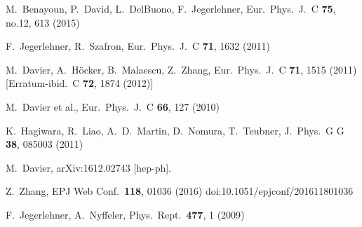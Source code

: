 \documentclass[epj,onecolumn]{webofc}
\begin{document}
\begin{thebibliography}{}
  M.~Benayoun, P.~David, L.~DelBuono, F.~Jegerlehner,
  Eur.\ Phys.\ J.\ C {\bf 75}, no.12,  613 (2015)

  F.~Jegerlehner, R.~Szafron,
  Eur.\ Phys.\ J.\ C {\bf 71}, 1632 (2011)

  M.~Davier, A.~H\"ocker, B.~Malaescu, Z.~Zhang,
  Eur.\ Phys.\ J.\ C {\bf 71}, 1515 (2011)
   [Erratum-ibid.\ C {\bf 72}, 1874 (2012)]

  M.~Davier et al.,
  Eur.\ Phys.\ J.\  C {\bf 66}, 127 (2010)

  K.~Hagiwara, R.~Liao, A.~D.~Martin, D.~Nomura, T.~Teubner,
  J.\ Phys.\ G G {\bf 38}, 085003 (2011)

  M.~Davier,
  arXiv:1612.02743 [hep-ph].

  Z.~Zhang,
  EPJ Web Conf.\  {\bf 118}, 01036 (2016)
  doi:10.1051/epjconf/201611801036

  F.~Jegerlehner, A.~Nyffeler,
  Phys.\ Rept.\  {\bf 477}, 1 (2009)


\end{thebibliography}
\end{document}

